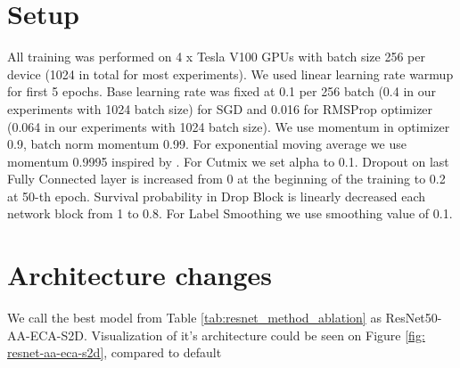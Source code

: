 \section{Setup}
All training was performed on 4 x Tesla V100 GPUs with batch size 256 per device (1024 in total for most experiments). We used linear learning rate warmup for first 5 epochs. Base learning rate was fixed at 0.1 per 256 batch (0.4 in our experiments with 1024 batch size) for SGD and 0.016 for RMSProp optimizer (0.064 in our experiments with 1024 batch size). We use momentum in optimizer 0.9, batch norm momentum 0.99. For exponential moving average we use momentum 0.9995 inspired by \cite{tan2021_efficientnetv2}. For Cutmix we set alpha to 0.1. Dropout on last Fully Connected layer is increased from 0 at the beginning of the training to 0.2 at 50-th epoch. Survival probability in Drop Block is linearly decreased each network block from 1 to 0.8. For Label Smoothing we use smoothing value of 0.1.  

\section{Architecture changes}
We call the best model from Table \ref{tab:resnet_method_ablation} as ResNet50-AA-ECA-S2D. Visualization of it's architecture could be seen on Figure \ref{fig: resnet-aa-eca-s2d}, compared to default 










